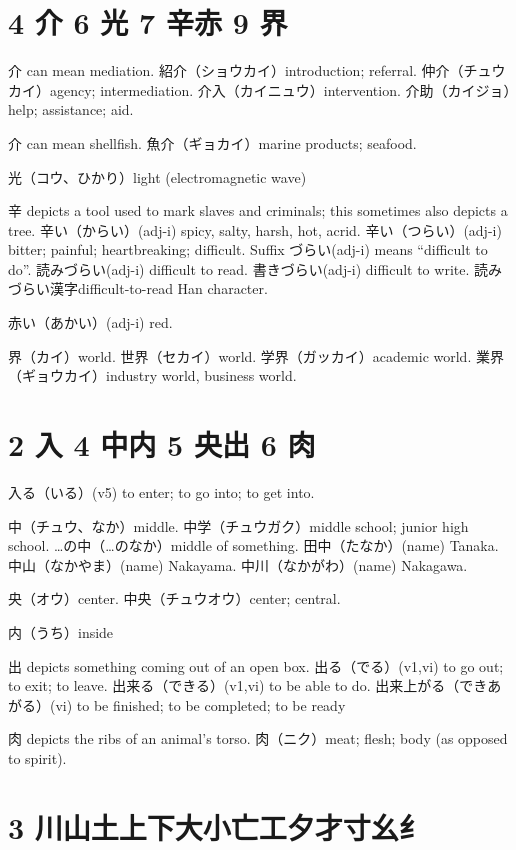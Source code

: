 \section{4 介 6 光 7 辛赤 9 界}

介 can mean mediation.
紹介（ショウカイ）introduction; referral.
仲介（チュウカイ）agency; intermediation.
介入（カイニュウ）intervention.
介助（カイジョ）help; assistance; aid.

介 can mean shellfish.
魚介（ギョカイ）marine products; seafood.

光（コウ、ひかり）light (electromagnetic wave)

辛 depicts a tool used to mark slaves and criminals;
this sometimes also depicts a tree.
辛い（からい）(adj-i) spicy, salty, harsh, hot, acrid.
辛い（つらい）(adj-i) bitter; painful; heartbreaking; difficult.
Suffix づらい(adj-i) means ``difficult to do''.
読みづらい(adj-i) difficult to read.
書きづらい(adj-i) difficult to write.
読みづらい漢字difficult-to-read Han character.

赤い（あかい）(adj-i) red.

界（カイ）world.
世界（セカイ）world.
学界（ガッカイ）academic world.
業界（ギョウカイ）industry world, business world.

\section{2 入 4 中内 5 央出 6 肉}

入る（いる）(v5)
to enter; to go into; to get into.

中（チュウ、なか）middle.
中学（チュウガク）middle school; junior high school.
…の中（…のなか）middle of something.
田中（たなか）(name) Tanaka.
中山（なかやま）(name) Nakayama.
中川（なかがわ）(name) Nakagawa.

央（オウ）center.
中央（チュウオウ）center; central.

内（うち）inside

出 depicts something coming out of an open box.
出る（でる）(v1,vi) to go out; to exit; to leave.
出来る（できる）(v1,vi) to be able to do.
出来上がる（できあがる）(vi) to be finished; to be completed; to be ready

肉 depicts the ribs of an animal's torso.
肉（ニク）meat; flesh; body (as opposed to spirit).

\section{3 川山土上下大小亡工夕才寸幺纟}

